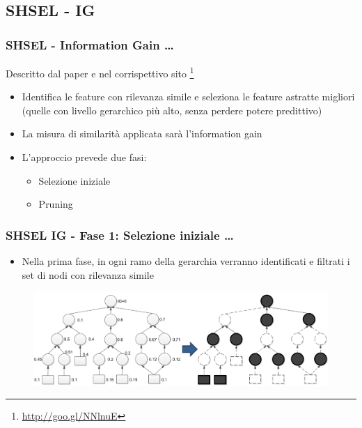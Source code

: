 \documentclass{beamer}
\begin{document}
\subsection{SHSEL - IG}
\begin{frame}
	\frametitle{SHSEL - Information Gain \dots}
	Descritto dal paper \cite{ristoski2014feature} e nel corrispettivo sito \footnote{\url{http://goo.gl/NNlnuE}}
	\begin{itemize}
		\item Identifica le feature con rilevanza simile e seleziona le feature astratte migliori (quelle con livello gerarchico più alto, senza perdere potere predittivo)
		\item La misura di similarità applicata sarà l'information gain
	\item L'approccio prevede due fasi:
	\begin{itemize}
		\item Selezione iniziale
		\item Pruning
	\end{itemize}
	\end{itemize}
\end{frame}

\begin{frame}
	\frametitle{SHSEL IG - Fase 1: Selezione iniziale \dots}
	\begin{itemize}
		\item Nella prima fase, in ogni ramo della gerarchia verranno identificati e filtrati i set di nodi con rilevanza simile
	\end{itemize}
	\begin{figure}[tbph]
		\centering
		\vspace{-0.2cm}
		\includegraphics[width=0.9\linewidth]{figure/Mannheim/SHSEL_Phase1.png}
		\label{fig:SHSELPhase1}
	\end{figure}
\end{frame}
\end{document}
